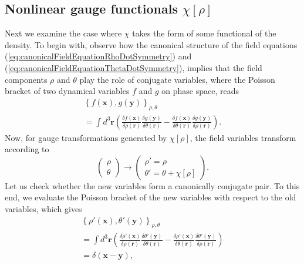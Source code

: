 \documentclass[twocolumn, nofootinbib, nobibnotes, amsmath,amssymb,aps, pra, floatfix]{revtex4-1}
\renewcommand{\v}[1]{\ensuremath{\mathbf{#1}}} %
\begin{document}
\subsection{\label{sec:nonlinearGaugeFunctionals}Nonlinear gauge functionals $\chi\left[\rho\right]$}
Next we examine the case where $\chi$ takes the form of some functional of the density.
To begin with, observe how the canonical structure of the field equations (\ref{eq:canonicalFieldEquationRhoDotSymmetry}) and (\ref{eq:canonicalFieldEquationThetaDotSymmetry}), implies that the field components $\rho$ and $\theta$ play the role of conjugate variables, where the Poisson bracket of two dynamical variables $f$ and $g$ on phase space, reads
\begin{multline}
    \left\{ f\left( \v{x} \right),g\left( \v{y} \right) \right\}_{\rho,\theta}\\
    =\int d^3\v{r}\left( \frac{\delta f\left( \v{x} \right)}{\delta\rho\left( \v{r} \right)}\frac{\delta g\left( \v{y} \right)}{\delta\theta\left( \v{r} \right)}-\frac{\delta f\left( \v{x} \right)}{\delta\theta\left( \v{r} \right)}\frac{\delta g\left( \v{y} \right)}{\delta\rho\left( \v{r} \right)} \right).
  \label{eq:poissonBracketReducedPhaseSpace}
\end{multline}
Now, for gauge transformations generated by $\chi\left[\rho\right]$, the field variables transform according to
\begin{equation}
  \begin{pmatrix}
    \rho \\ \theta
  \end{pmatrix}
  \rightarrow
  \begin{pmatrix}
    \rho'=\rho \\ \theta'=\theta+\chi\left[ \rho \right]
  \end{pmatrix}.
  \label{}
\end{equation}
Let us check whether the new variables form a canonically conjugate pair.
To this end, we evaluate the Poisson bracket of the new variables with respect to the old variables, which gives
\begin{multline}
  \left\{ \rho'\left( \v{x}\right), \theta'\left( \v{y}  \right) \right\}_{\rho,\theta}\\
  =\int d^3\v{r}\left( \frac{\delta\rho'\left( \v{x} \right)}{\delta\rho\left( \v{r} \right)}\frac{\delta\theta'\left( \v{y} \right)}{\delta\theta\left( \v{r} \right)}-\frac{\delta\rho'\left( \v{x} \right)}{\delta\theta\left( \v{r} \right)}\frac{\delta\theta'\left( \v{y} \right)}{\delta\rho\left( \v{r} \right)} \right)\\
  =\delta\left( \v{x}-\v{y} \right),
  \label{}
\end{multline}
\end{document}

